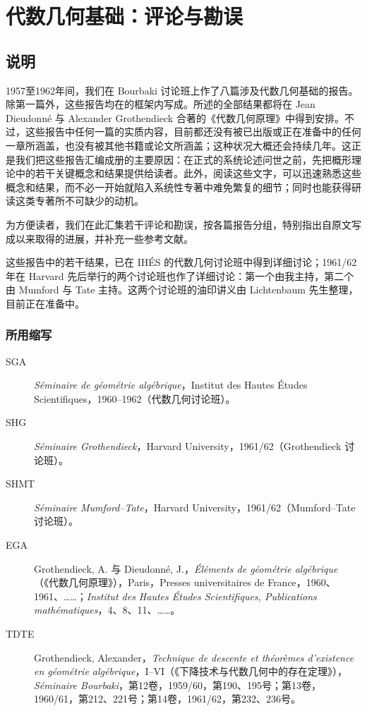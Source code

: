 \chapter*{代数几何基础：评论与勘误}
\section*{说明}
1957至1962年间，我们在 Bourbaki 讨论班上作了八篇涉及代数几何基础的报告。除第一篇外，这些报告均在的框架内写成。所述的全部结果都将在 Jean Dieudonné 与 Alexander Grothendieck 合著的《代数几何原理》中得到安排。不过，这些报告中任何一篇的实质内容，目前都还没有被已出版或正在准备中的任何一章所涵盖，也没有被其他书籍或论文所涵盖；这种状况大概还会持续几年。这正是我们把这些报告汇编成册的主要原因：在正式的系统论述问世之前，先把概形理论中的若干关键概念和结果提供给读者。此外，阅读这些文字，可以迅速熟悉这些概念和结果，而不必一开始就陷入系统性专著中难免繁复的细节；同时也能获得研读这类专著所不可缺少的动机。

为方便读者，我们在此汇集若干评论和勘误，按各篇报告分组，特别指出自原文写成以来取得的进展，并补充一些参考文献。

这些报告中的若干结果，已在 IHÉS 的代数几何讨论班中得到详细讨论；1961/62年在 Harvard 先后举行的两个讨论班也作了详细讨论：第一个由我主持，第二个由 Mumford 与 Tate 主持。这两个讨论班的油印讲义由 Lichtenbaum 先生整理，目前正在准备中。

\subsection*{所用缩写}
\begin{description}
\item[SGA] \textit{Séminaire de géométrie algébrique}，Institut des Hautes Études Scientifiques，1960--1962（代数几何讨论班）。
\item[SHG] \textit{Séminaire Grothendieck}，Harvard University，1961/62（Grothendieck 讨论班）。
\item[SHMT] \textit{Séminaire Mumford--Tate}，Harvard University，1961/62（Mumford--Tate 讨论班）。
\item[EGA] Grothendieck, A. 与 Dieudonné, J.，\textit{Éléments de géométrie algébrique}（《代数几何原理》），Paris，Presses universitaires de France，1960、1961、……；\textit{Institut des Hautes Études Scientifiques, Publications mathématiques}，4、8、11、……。
\item[TDTE] Grothendieck, Alexander，\textit{Technique de descente et théorèmes d'existence en géométrie algébrique}，I--VI（《下降技术与代数几何中的存在定理》），\textit{Séminaire Bourbaki}，第12卷，1959/60，第190、195号；第13卷，1960/61，第212、221号；第14卷，1961/62，第232、236号。
\end{description}

